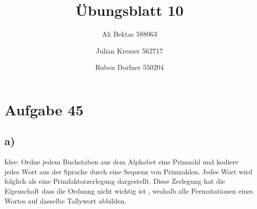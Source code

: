 \documentclass{article}
\title{Übungsblatt 10}
\author{Ali Bektas 588063 \and Julian Kremer 562717 \and Ruben Dorfner 550204}
\begin{document}
	\maketitle

	\section*{Aufgabe 45}

		\subsection*{a)}Idee: Ordne jedem Buchstaben aus dem Alphabet eine Primzahl und kodiere jedes Wort aus der Sprache durch eine Sequenz von Primzahlen. Jedes Wort wird folglich als eine Primfaktorzerlegung dargestellt. Diese Zerlegung hat die Eigenschaft dass die Ordnung nicht wichtig ist , weshalb alle Permutationen eines Wortes auf dasselbe Tallywort abbilden.
\end{document}

